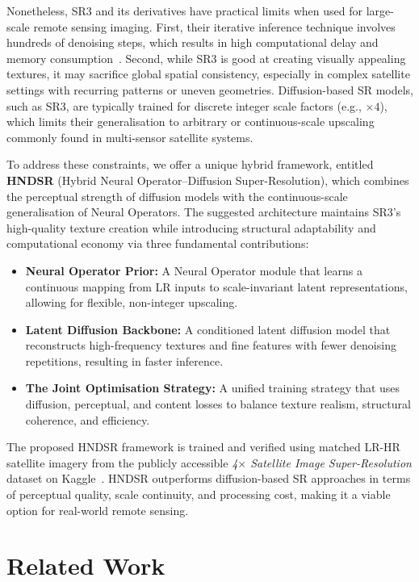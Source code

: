 \documentclass[conference]{IEEEtran}
\begin{document}
Nonetheless, SR3 and its derivatives have practical limits when used for large-scale remote sensing imaging.  First, their iterative inference technique involves hundreds of denoising steps, which results in high computational delay and memory consumption~\cite{saharia2022image}.  Second, while SR3 is good at creating visually appealing textures, it may sacrifice global spatial consistency, especially in complex satellite settings with recurring patterns or uneven geometries.  Diffusion-based SR models, such as SR3, are typically trained for discrete integer scale factors (e.g., $\times4$), which limits their generalisation to arbitrary or continuous-scale upscaling commonly found in multi-sensor satellite systems.

To address these constraints, we offer a unique hybrid framework, entitled \textbf{HNDSR} (Hybrid Neural Operator--Diffusion Super-Resolution), which combines the perceptual strength of diffusion models with the continuous-scale generalisation of Neural Operators.  The suggested architecture maintains SR3's high-quality texture creation while introducing structural adaptability and computational economy via three fundamental contributions:
\begin{itemize}
    \item \textbf{Neural Operator Prior:}  A Neural Operator module that learns a continuous mapping from LR inputs to scale-invariant latent representations, allowing for flexible, non-integer upscaling.
     \item \textbf {Latent Diffusion Backbone:}  A conditioned latent diffusion model that reconstructs high-frequency textures and fine features with fewer denoising repetitions, resulting in faster inference.
     \item \textbf{The Joint Optimisation Strategy:}  A unified training strategy that uses diffusion, perceptual, and content losses to balance texture realism, structural coherence, and efficiency.
 \end{itemize}

The proposed HNDSR framework is trained and verified using matched LR-HR satellite imagery from the publicly accessible \textit{4$\times$ Satellite Image Super-Resolution} dataset on Kaggle~\cite{tudela2023dataset}.  HNDSR outperforms diffusion-based SR approaches in terms of perceptual quality, scale continuity, and processing cost, making it a viable option for real-world remote sensing.

\section{Related Work}
\end{document}
